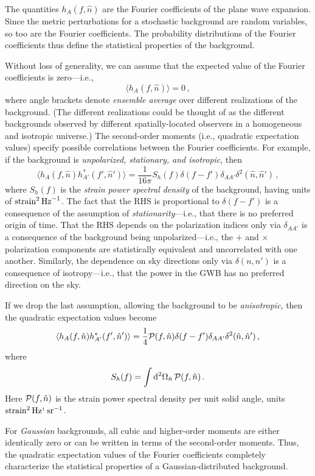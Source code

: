 \documentclass[11pt]{article}
\numberwithin{equation}{section}
\def\be{\begin{equation}}
\def\ee{\end{equation}}
\def\D{{\rm d}}
\begin{document}
The quantities $h_A(f,\hat n)$ are the Fourier 
coefficients of the plane wave expansion.
Since the metric perturbations 
for a stochastic background are random variables, 
so too are the 
Fourier coefficients.
The probability distributions of the Fourier coefficients
thus define the statistical properties of the background.

Without loss of generality, we can assume that the 
expected value of the Fourier coefficients is 
zero---i.e.,
%
\be
\langle h_A(f,\hat n)\rangle=0\,,
\ee
%
where angle brackets denote {\em ensemble average}
over different realizations of the background.
(The different realizations could be thought of 
as the different backgrounds observed by
different spatially-located observers in a homogeneous 
and isotropic universe.)
The second-order moments (i.e., quadratic expectation 
values) specify possible correlations between the 
Fourier coefficients.
For example, if the background is 
{\em unpolarized, stationary, and isotropic}, then
%
\be
\langle h_A(f,\hat n)h_{A'}^*(f',\hat n')\rangle
=\frac{1}{16\pi} S_h(f)\delta(f-f')\delta_{AA'}\delta^2(\hat n,\hat n')\,,
\label{e:quad_iso}
\ee
%
where $S_h(f)$ is the {\em strain power spectral 
density} of the background, 
having units of ${\rm strain}^2\,{\rm Hz}^{-1}$.
The fact that the RHS is proportional 
to $\delta(f-f')$ is a consequence of the assumption
of {\em stationarity}---i.e., that there is no 
preferred origin of time.
That the RHS depends on the polarization indices
only via  $\delta_{AA'}$ is a consequence of the 
background being unpolarized---i.e., the $+$ and $\times$ 
polarization components are statistically
equivalent and uncorrelated with one another.
Similarly, the dependence on sky directions only via 
$\delta(n,n')$ is a consequence of isotropy---i.e., 
that the power in the GWB has no preferred
direction on the sky.

If we drop the last assumption, allowing the background
to be {\em anisotropic}, then the quadratic
expectation values become
%
\be
\langle h_A(f,\hat n)h_{A'}^*(f',\hat n')\rangle
=\frac{1}{4} {\cal P}(f,\hat n)\delta(f-f')\delta_{AA'}\delta^2(\hat n,\hat n')\,,
\label{e:quad_aniso}
\ee
%
where
%
\be
S_h(f) = \int \D^2\Omega_{\hat n}\,{\cal P}(f,\hat n)\,.
\ee
%
Here ${\cal P}(f,\hat n)$ is the strain power
spectral density per unit solid angle,
units ${\rm strain}^2\,{\rm Hz}^{_1}\,{\rm sr}^{-1}$.

For {\em Gaussian} backgrounds, all cubic 
and higher-order moments are either identically zero 
or can be written in terms of the second-order moments.
Thus, the quadratic expectation values of the Fourier
coefficients completely characterize the statistical
properties of a Gaussian-distributed background.
\end{document}
